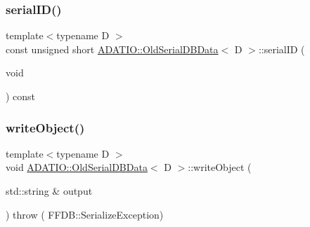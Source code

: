 \mbox{\label{classADATIO_1_1OldSerialDBData_a379c8edee426f2a5ce3f41d0c46777de}} 
\subsubsection{\texorpdfstring{serialID()}{serialID()}\hspace{0.1cm}{\footnotesize\ttfamily [3/3]}}
{\footnotesize\ttfamily template$<$typename D $>$ \\
const unsigned short \mbox{\hyperlink{classADATIO_1_1OldSerialDBData}{A\+D\+A\+T\+I\+O\+::\+Old\+Serial\+D\+B\+Data}}$<$ D $>$\+::serial\+ID (\begin{DoxyParamCaption}\item[{void}]{ }\end{DoxyParamCaption}) const\hspace{0.3cm}{\ttfamily [inline]}}

\mbox{\label{classADATIO_1_1OldSerialDBData_aec52af4bfb6beb74fc039b9b25328270}} 
\subsubsection{\texorpdfstring{writeObject()}{writeObject()}\hspace{0.1cm}{\footnotesize\ttfamily [1/3]}}
{\footnotesize\ttfamily template$<$typename D $>$ \\
void \mbox{\hyperlink{classADATIO_1_1OldSerialDBData}{A\+D\+A\+T\+I\+O\+::\+Old\+Serial\+D\+B\+Data}}$<$ D $>$\+::write\+Object (\begin{DoxyParamCaption}\item[{std\+::string \&}]{output }\end{DoxyParamCaption}) throw ( F\+F\+D\+B\+::\+Serialize\+Exception) \hspace{0.3cm}{\ttfamily [inline]}}

